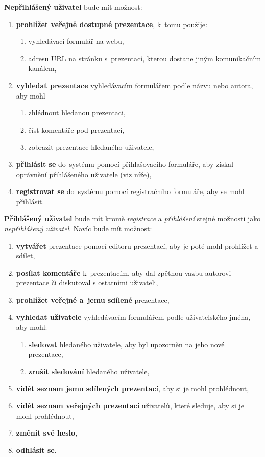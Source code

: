 \documentclass[11pt,twoside,a4paper]{book}
\begin{document}
\noindent \textbf{Nepřihlášený uživatel} bude mít možnost:
\begin{enumerate}
	\item \textbf{prohlížet veřejně dostupné prezentace}, k~tomu použije:
		\begin{enumerate}[label*=\arabic*.]
			\item vyhledávací formulář na webu,
			\item adresu URL na stránku s~prezentací, kterou dostane jiným komunikačním kanálem,
		\end{enumerate}
	\item \textbf{vyhledat prezentace} vyhledávacím formulářem podle názvu nebo autora, aby mohl
		\begin{enumerate}[label*=\arabic*.]
			\item zhlédnout hledanou prezentaci,
			\item číst komentáře pod prezentací,
			\item zobrazit prezentace hledaného uživatele,
		\end{enumerate}
	\item \textbf{přihlásit se} do~systému pomocí přihlašovacího formuláře, aby získal oprávnění přihlášeného uživatele (viz níže),
	\item \textbf{registrovat se} do~systému pomocí registračního formuláře, aby se mohl přihlásit.
\end{enumerate}


\noindent \textbf{Přihlášený uživatel} bude mít kromě \textit{registrace} a \textit{přihlášení} stejné možnosti jako \textit{nepřihlášený uživatel}. Navíc bude mít možnost:
\begin{enumerate}
	\item \textbf{vytvářet} prezentace pomocí editoru prezentací, aby je poté mohl prohlížet a sdílet,
	\item \textbf{posílat komentáře} k~prezentacím, aby dal zpětnou vazbu autorovi prezentace či diskutoval s ostatními uživateli,
	\item \textbf{prohlížet veřejné a~jemu sdílené} prezentace,
	\item \textbf{vyhledat uživatele} vyhledávacím formulářem podle uživatelského jména, aby mohl:
		\begin{enumerate}[label*=\arabic*.]
		\item \textbf{sledovat} hledaného uživatele, aby byl upozorněn na jeho nové prezentace,
		\item \textbf{zrušit sledování} hledaného uživatele,
		\end{enumerate}
	\item \textbf{vidět seznam jemu sdílených prezentací}, aby si je mohl prohlédnout,
	\item \textbf{vidět seznam veřejných prezentací} uživatelů, které sleduje, aby si je mohl prohlédnout,
	\item \textbf{změnit své heslo},
	\item \textbf{odhlásit se}.
\end{enumerate}
\end{document}
